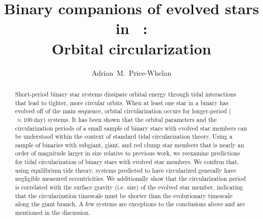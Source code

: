 \documentclass[modern, letterpaper]{aastex62}
\newcommand{\apogee}{\project{\acronym{APOGEE}}}
\newcommand{\DR}{\acronym{DR14}}
\begin{document}
\sloppy\sloppypar\raggedbottom\frenchspacing %

\title{Binary companions of evolved stars in \apogee\ \DR: \\
       Orbital circularization}

\author[0000-0003-0872-7098]{Adrian~M.~Price-Whelan}



\begin{abstract}\noindent %
Short-period binary star systems dissipate orbital energy through tidal
interactions that lead to tighter, more circular orbits.
When at least one star in a binary has evolved off of the main sequence, orbital
circularization occurs for longer-period ($\approx 100~\textrm{day}$) systems.
It has been shown that the orbital parameters and the circularization periods of
a small sample of binary stars with evolved star members can be understood
within the context of standard tidal circularization theory.
Using a sample of binaries with subgiant, giant, and red clump star members that
is nearly an order of magnitude larger in size relative to previous work, we
reexamine predictions for tidal circularization of binary stars with evolved
star members.
We confirm that, using equilibrium tide theory, systems predicted to have
circularized generally have negligible measured eccentricities.
We additionally show that the circularization period is correlated with the
surface gravity (i.e. size) of the evolved star member, indicating that the
circularization timescale must be shorter than the evolutionary timescale along
the giant branch.
A few systems are exceptions to the conclusions above and are mentioned in the
discussion.

\end{abstract}
\end{document}
